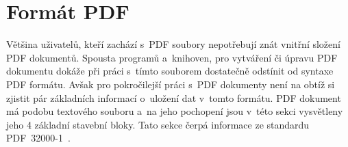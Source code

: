 \section{Formát PDF} \label{format_PDF}
Většina uživatelů, kteří zachází s~PDF soubory nepotřebují znát vnitřní složení
PDF dokumentů. Spousta programů a~knihoven, pro vytváření či úpravu PDF dokumentu
dokáže při práci s~tímto souborem dostatečně odstínit od syntaxe PDF formátu.
Avšak pro pokročilejší práci s~PDF dokumenty není na obtíž si zjistit pár
základních informací o~uložení dat v~tomto formátu.
PDF dokument má podobu textového souboru a~na jeho pochopení jsou v~této sekci
vysvětleny jeho 4 základní stavební bloky. Tato sekce čerpá informace ze
standardu PDF~32000-1~\cite[k.~7, s.~11--109]{PDF32000-1:2008}.


